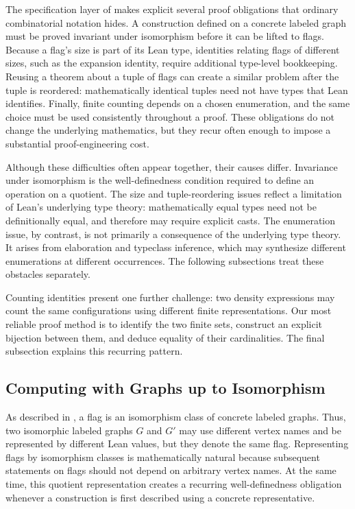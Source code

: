 \documentclass{article}
\begin{document}
The specification layer of  makes explicit several proof
obligations that ordinary combinatorial notation hides.  A construction
defined on a concrete labeled graph must be proved invariant under
isomorphism before it can be lifted to flags.  Because a flag's size is part
of its Lean type, identities relating flags of different sizes, such as the
expansion identity, require additional type-level bookkeeping.  Reusing a
theorem about a tuple of flags can create a similar problem after the tuple
is reordered: mathematically identical tuples need not have types that Lean
identifies.  Finally, finite counting depends on a chosen enumeration, and
the same choice must be used consistently throughout a proof.  These
obligations do not change the underlying mathematics, but they recur often
enough to impose a substantial proof-engineering cost.

Although these difficulties often appear together, their causes differ.
Invariance under isomorphism is the well-definedness condition required to
define an operation on a quotient.  The size and tuple-reordering issues
reflect a limitation of Lean's underlying type theory: mathematically equal
types need not be definitionally equal, and therefore may require explicit
casts.  The enumeration issue, by contrast, is not primarily a
consequence of the underlying type theory.  It arises from elaboration and
typeclass inference, which may synthesize different enumerations at different
occurrences.  The following subsections treat these obstacles separately.

Counting identities present one further challenge: two density expressions
may count the same configurations using different finite representations.
Our most reliable proof method is to identify the two finite sets, construct
an explicit bijection between them, and deduce equality of their
cardinalities.  The final subsection explains this recurring pattern.

\subsection{Computing with Graphs up to Isomorphism}

As described in , a flag is an isomorphism class of
concrete labeled graphs.  Thus, two isomorphic labeled graphs $G$ and $G'$ may
use different vertex names and be represented by different Lean values, but
they denote the same flag.  Representing flags by isomorphism classes is
mathematically natural because subsequent statements on flags should not depend on
arbitrary vertex names.  At the same time, this quotient representation
creates a recurring well-definedness obligation whenever a construction is
first described using a concrete representative.
\end{document}
